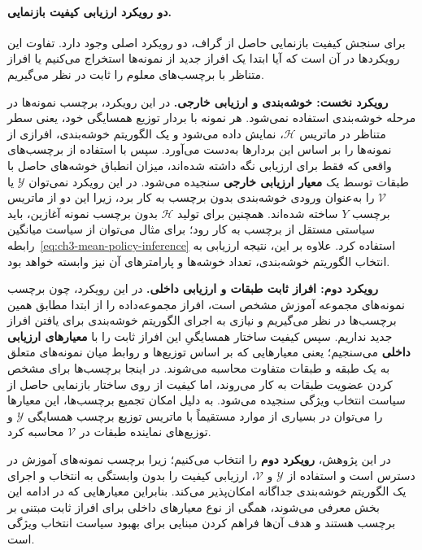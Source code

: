 \paragraph{دو رویکرد ارزیابی کیفیت بازنمایی.}
برای سنجش کیفیت بازنمایی حاصل از گراف، دو رویکرد اصلی وجود دارد. تفاوت این رویکردها در آن است که آیا ابتدا یک افراز جدید از نمونه‌ها استخراج می‌کنیم یا افراز متناظر با برچسب‌های معلوم را ثابت در نظر می‌گیریم.

\noindent\textbf{رویکرد نخست: خوشه‌بندی و ارزیابی خارجی.}
در این رویکرد، برچسب نمونه‌ها در مرحله خوشه‌بندی استفاده نمی‌شود. هر نمونه با بردار توزیع همسایگی خود، یعنی سطر متناظر در ماتریس $\mathscr H$، نمایش داده می‌شود و یک الگوریتم خوشه‌بندی، افرازی از نمونه‌ها را بر اساس این بردارها به‌دست می‌آورد. سپس با استفاده از برچسب‌های واقعی که فقط برای ارزیابی نگه داشته شده‌اند، میزان انطباق خوشه‌های حاصل با طبقات توسط یک \textbf{معیار ارزیابی خارجی} سنجیده می‌شود. در این رویکرد نمی‌توان $\mathscr Y$ یا $\mathcal V$ را به‌عنوان ورودی خوشه‌بندی بدون برچسب به کار برد، زیرا این دو از ماتریس برچسب $Y$ ساخته شده‌اند. همچنین برای تولید $\mathscr H$ بدون برچسب نمونه آغازین، باید سیاستی مستقل از برچسب به کار رود؛ برای مثال می‌توان از سیاست میانگین رابطه~\eqref{eq:ch3-mean-policy-inference} استفاده کرد. علاوه بر این، نتیجه ارزیابی به انتخاب الگوریتم خوشه‌بندی، تعداد خوشه‌ها و پارامترهای آن نیز وابسته خواهد بود.

\noindent\textbf{رویکرد دوم: افراز ثابت طبقات و ارزیابی داخلی.}
در این رویکرد، چون برچسب نمونه‌های مجموعه آموزش مشخص است، افراز مجموعه‌داده را از ابتدا مطابق همین برچسب‌ها در نظر می‌گیریم و نیازی به اجرای الگوریتم خوشه‌بندی برای یافتن افراز جدید نداریم. سپس کیفیت ساختار همسایگیِ این افراز ثابت را با \textbf{معیارهای ارزیابی داخلی} می‌سنجیم؛ یعنی معیارهایی که بر اساس توزیع‌ها و روابط میان نمونه‌های متعلق به یک طبقه و طبقات متفاوت محاسبه می‌شوند. در اینجا برچسب‌ها برای مشخص کردن عضویت طبقات به کار می‌روند، اما کیفیت از روی ساختار بازنمایی حاصل از سیاست انتخاب ویژگی سنجیده می‌شود. به دلیل امکان تجمیع برچسب‌ها، این معیارها را می‌توان در بسیاری از موارد مستقیماً با ماتریس توزیع برچسب همسایگی $\mathscr Y$ و توزیع‌های نماینده طبقات در $\mathcal V$ محاسبه کرد.

در این پژوهش، \textbf{رویکرد دوم} را انتخاب می‌کنیم؛ زیرا برچسب نمونه‌های آموزش در دسترس است و استفاده از $\mathscr Y$ و $\mathcal V$، ارزیابی کیفیت را بدون وابستگی به انتخاب و اجرای یک الگوریتم خوشه‌بندی جداگانه امکان‌پذیر می‌کند. بنابراین معیارهایی که در ادامه این بخش معرفی می‌شوند، همگی از نوع معیارهای داخلی برای افراز ثابت مبتنی بر برچسب هستند و هدف آن‌ها فراهم کردن مبنایی برای بهبود سیاست انتخاب ویژگی است.


